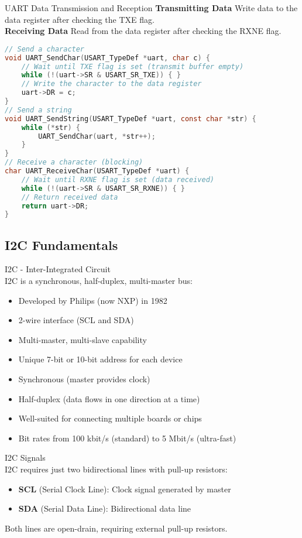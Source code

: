 \begin{KR}{UART Data Transmission and Reception}
\textbf{Transmitting Data}
Write data to the data register after checking the TXE flag.\\
\textbf{Receiving Data}
Read from the data register after checking the RXNE flag.

\begin{lstlisting}[language=C, style=basesmol]
// Send a character
void UART_SendChar(USART_TypeDef *uart, char c) {
    // Wait until TXE flag is set (transmit buffer empty)
    while (!(uart->SR & USART_SR_TXE)) { }
    // Write the character to the data register
    uart->DR = c;
}
// Send a string
void UART_SendString(USART_TypeDef *uart, const char *str) {
    while (*str) {
        UART_SendChar(uart, *str++);
    }
}
// Receive a character (blocking)
char UART_ReceiveChar(USART_TypeDef *uart) {
    // Wait until RXNE flag is set (data received)
    while (!(uart->SR & USART_SR_RXNE)) { }
    // Return received data
    return uart->DR;
}
\end{lstlisting}
\end{KR}


\subsection{I2C Fundamentals}

\begin{concept}{I2C - Inter-Integrated Circuit}\\
I2C is a synchronous, half-duplex, multi-master bus:
\begin{itemize}
    \item Developed by Philips (now NXP) in 1982
    \item 2-wire interface (SCL and SDA)
    \item Multi-master, multi-slave capability
    \item Unique 7-bit or 10-bit address for each device
    \item Synchronous (master provides clock)
    \item Half-duplex (data flows in one direction at a time)
    \item Well-suited for connecting multiple boards or chips
    \item Bit rates from 100 kbit/s (standard) to 5 Mbit/s (ultra-fast)
\end{itemize}
\end{concept}

\begin{definition}{I2C Signals}\\
I2C requires just two bidirectional lines with pull-up resistors:
\begin{itemize}
    \item \textbf{SCL} (Serial Clock Line): Clock signal generated by master
    \item \textbf{SDA} (Serial Data Line): Bidirectional data line
\end{itemize}
Both lines are open-drain, requiring external pull-up resistors.
\end{definition}

